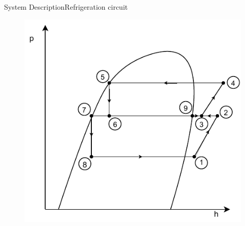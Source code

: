 \begin{frame}{System Description}{Refrigeration circuit}
\begin{figure}[h]
\begin{minipage}{0.4\textwidth}
		\includegraphics[width=1.05\textwidth]{../Graphics/Flash_Tank_P-h_Diagram} %
	\end{minipage}
\end{figure}
\end{frame}

%	

%

